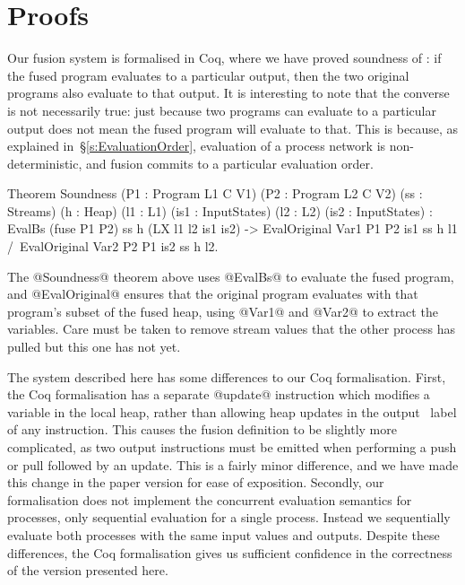 
\section{Proofs}
\label{s:Proofs}

Our fusion system is formalised in Coq, where we have proved soundness of : if the fused program evaluates to a particular output, then the two original programs also evaluate to that output.
It is interesting to note that the converse is not necessarily true: just because two programs can evaluate to a particular output does not mean the fused program will evaluate to that.
This is because, as explained in~\S\ref{s:EvaluationOrder}, evaluation of a process network is non-deterministic, and fusion commits to a particular evaluation order.

\begin{code}
Theorem Soundness (P1 : Program L1 C V1) (P2 : Program L2 C V2) (ss : Streams) (h : Heap)
    (l1 : L1) (is1 : InputStates) (l2 : L2) (is2 : InputStates) :
  EvalBs (fuse P1 P2) ss h (LX l1 l2 is1 is2)
  -> EvalOriginal Var1 P1 P2 is1 ss h l1 /\ EvalOriginal Var2 P2 P1 is2 ss h l2.
\end{code}

The @Soundness@ theorem above uses @EvalBs@ to evaluate the fused program, and @EvalOriginal@ ensures that the original program evaluates with that program's subset of the fused heap, using @Var1@ and @Var2@ to extract the variables.
Care must be taken to remove stream values that the other process has pulled but this one has not yet.

The system described here has some differences to our Coq formalisation.
First, the Coq formalisation has a separate @update@ instruction which modifies a variable in the local heap, rather than allowing heap updates in the output \Next~label of any instruction.
This causes the fusion definition to be slightly more complicated, as two output instructions must be emitted when performing a push or pull followed by an update.
This is a fairly minor difference, and we have made this change in the paper version for ease of exposition.
Secondly, our formalisation does not implement the concurrent evaluation semantics for processes, only sequential evaluation for a single process.
Instead we sequentially evaluate both processes with the same input values and outputs.
Despite these differences, the Coq formalisation gives us sufficient confidence in the correctness of the version presented here.


